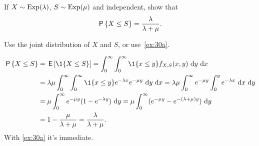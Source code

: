 \begin{exercise}\label{ex:3}
 If  
$X\sim \Exp(\lambda)$, $S\sim\Exp(\mu)$  and independent, show that 
 \begin{equation*}
 \P{X\leq S} = \frac{\lambda}{\lambda+\mu}.
 \end{equation*}
\begin{hint}
Use the joint distribution of $X$ and $S$, or use~\cref{ex:30a}.
\end{hint}
\begin{solution}
\begin{align*}
 \P{X\leq S} 
&= \E{\1{X\leq S}} = \int_0^\infty \int_0^\infty \1{x\leq y} f_{X,S}(x,y)\, \d y\,\d x\\
&= \lambda \mu \int_0^\infty \int_0^\infty \1{x\leq y} e^{-\lambda x} e^{-\mu y} \, \d y\,\d x
= \lambda \mu \int_0^\infty e^{-\mu y} \int_0^y e^{-\lambda x}\, \d x \, \d y \\
&= \mu \int_0^\infty e^{-\mu y} (1-e^{-\lambda y})\,\d y= \mu \int_0^\infty (e^{-\mu y} - e^{-(\lambda +\mu)y} ) \,\d y\\
&= 1 - \frac{\mu}{\lambda + \mu} = \frac{\lambda}{\lambda + \mu}.
\end{align*}
With \cref{ex:30a} it's immediate.

\end{solution}
\end{exercise}



